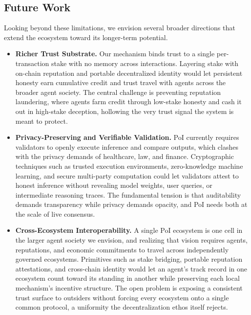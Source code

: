 \subsection{Future Work}
\label{sec:future_work}

Looking beyond these limitations, we envision several broader directions that extend the ecosystem toward its longer-term potential.

\begin{itemize}[leftmargin=1.5em, itemsep=4pt, topsep=2pt]
    \item \textbf{Richer Trust Substrate.} Our mechanism binds trust to a single per-transaction stake with no memory across interactions. Layering stake with on-chain reputation and portable decentralized identity would let persistent honesty earn cumulative credit and trust travel with agents across the broader agent society. The central challenge is preventing reputation laundering, where agents farm credit through low-stake honesty and cash it out in high-stake deception, hollowing the very trust signal the system is meant to protect.

    \item \textbf{Privacy-Preserving and Verifiable Validation.} PoI currently requires validators to openly execute inference and compare outputs, which clashes with the privacy demands of healthcare, law, and finance. Cryptographic techniques such as trusted execution environments, zero-knowledge machine learning, and secure multi-party computation could let validators attest to honest inference without revealing model weights, user queries, or intermediate reasoning traces. The fundamental tension is that auditability demands transparency while privacy demands opacity, and PoI needs both at the scale of live consensus.

    \item \textbf{Cross-Ecosystem Interoperability.} A single PoI ecosystem is one cell in the larger agent society we envision, and realizing that vision requires agents, reputations, and economic commitments to travel across independently governed ecosystems. Primitives such as stake bridging, portable reputation attestations, and cross-chain identity would let an agent's track record in one ecosystem count toward its standing in another while preserving each local mechanism's incentive structure. The open problem is exposing a consistent trust surface to outsiders without forcing every ecosystem onto a single common protocol, a uniformity the decentralization ethos itself rejects.


\end{itemize}
